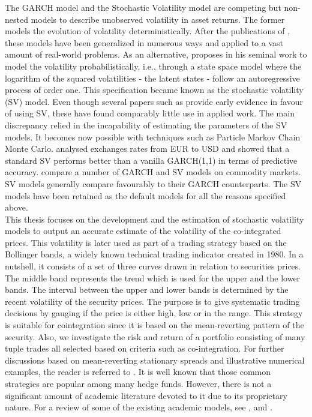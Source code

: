\documentclass[11pt,a4,twosided,singlespacing,titlepagenumber=on]{scrreprt}
\numberwithin{equation}{chapter} %
\theoremstyle{remark}
\begin{document}
\noindent
The GARCH model and the Stochastic Volatility model are competing but non-nested models to describe unobserved volatility in asset returns. The former models the evolution of volatility deterministically. After the publications of \cite{engle1986}, these models have been generalized in numerous ways and applied to a vast amount of real-world problems. As an alternative, \cite{taylor1982} proposes in his seminal work to model the volatility probabilistically, i.e., through a state space model where the logarithm of the squared volatilities - the latent states - follow an autoregressive process of order one. This specification became known as the stochastic volatility (SV) model. Even though several papers such as \cite{kim1998} provide early evidence in favour of using SV, these have found comparably little use in applied work. The main discrepancy relied in the incapability of estimating the parameters of the SV models. It becomes now possible with techniques such as Particle Markov Chain Monte Carlo. \cite{kastner2014} analysed exchanges rates from EUR to USD and showed that a standard SV performs better than a vanilla GARCH(1,1) in terms of predictive accuracy. \cite{chan2015} compare a number of GARCH and SV models on commodity markets. SV models generally compare favourably to their GARCH counterparts. The SV models have been retained as the default models for all the reasons specified above. \\

\noindent
This thesis focuses on the development and the estimation of stochastic volatility models to output an accurate estimate of the volatility of the co-integrated prices. This volatility is later used as part of a trading strategy based on the Bollinger bands, a widely known technical trading indicator created in 1980. In a nutshell, it consists of a set of three curves drawn in relation to securities prices. The middle band represents the trend which is used for the upper and the lower bands. The interval between the upper and lower bands is determined by the recent volatility of the security prices. The purpose is to give systematic trading decisions by gauging if the price is either high, low or in the range. This strategy is suitable for cointegration since it is based on the mean-reverting pattern of the security. Also, we investigate the risk and return of a portfolio consisting of many tuple trades all selected based on criteria such as co-integration. For further discussions based on mean-reverting stationary spreads and illustrative numerical examples, the reader is referred to \cite{vidyamurthy2004}.  It is well known that those common strategies are popular among many hedge funds. However, there is not a significant amount of academic literature devoted to it due to its proprietary nature. For a review of some of the existing academic models, see \cite{gatev2006}, \cite{perlin2009} and \cite{broussard2012}. \\
\end{document}
